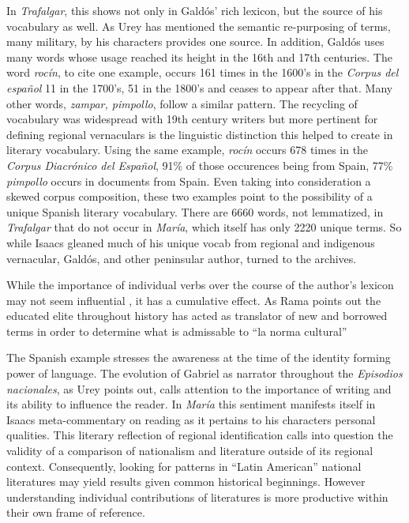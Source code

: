 \documentclass[12pt]{report}
\begin{document}
In \textit{Trafalgar}, this shows not only in Galdós' rich lexicon, but the source of his vocabulary as well. 
As Urey has mentioned the semantic re-purposing of terms, many military, by his characters provides one source.
In addition, Galdós uses many words whose usage reached its height in the 16th and 17th centuries.
The word \textit{rocín}, to cite one example, occurs 161 times in the 1600's in the \textit{Corpus del español} 11 in the 1700's, 51 in the 1800's and ceases to appear after that. 
Many other words, \textit{zampar, pimpollo}, follow a similar pattern.
The recycling of vocabulary was widespread with 19th century writers but more pertinent for defining regional vernaculars is the linguistic distinction this helped to create in literary vocabulary.
Using the same example, \textit{rocín} occurs 678 times in the \textit{Corpus Diacrónico del Español}, 91\% of those occurences being from Spain, 77\% \textit{pimpollo} occurs in documents from Spain. 
Even taking into consideration a skewed corpus composition, these two examples point to the possibility of a unique Spanish literary vocabulary.
There are 6660 words, not lemmatized, in \textit{Trafalgar} that do not occur in \textit{María}, which itself has only 2220 unique terms.
So while Isaacs gleaned much of his unique vocab from regional and indigenous vernacular, Galdós, and other peninsular author, turned to the archives.

While the importance of individual verbs over the course of the author's lexicon may not seem influential , it has a cumulative effect.
As Rama points out the educated elite throughout history has acted as translator of new and borrowed terms in order to determine what is admissable to \enquote{la norma cultural} \cite[50]{Rama2002}

The Spanish example stresses the awareness at the time of the identity forming power of language. The evolution of Gabriel as narrator throughout the \textit{Episodios nacionales}, as Urey points out, calls attention to the importance of writing and its ability to influence the reader. In \textit{María} this sentiment manifests itself in Isaacs meta-commentary on reading as it pertains to his characters personal qualities. This literary reflection of regional identification calls into question the validity of a comparison of nationalism and literature outside of its regional context. Consequently, looking for patterns in \enquote{Latin American} national literatures may yield results given common historical beginnings. However understanding individual contributions of literatures is more productive within their own frame of reference.
\end{document}
